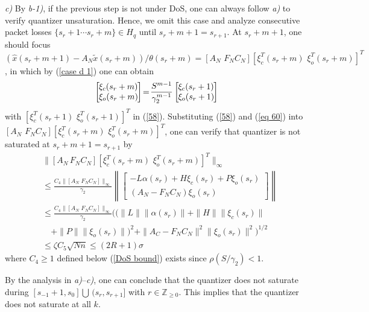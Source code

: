 \documentclass[letterpaper,journal,final,twocolumn]{IEEEtran}
\begin{document}
\emph{c)} By \emph{b-1)}, if the previous step is not under DoS, one can always follow \emph{a)} to verify quantizer unsaturation. Hence, we omit this case and analyze consecutive packet losses $\{s_r + 1 \cdots s_r+m\}\in H_q$ until $s_r+m+1=s_{r+1}$. At $s_r+m+1$, one should focus $ (\hat x(s_r+m+1) - A_N \tilde x(s_r+m))/\theta (s_r+m)= [A_N \,\, F_N C_N] [\xi_c ^T(s_r+m) \,\,
\xi_ o ^T (s_r+m )]^T$, in which by (\ref{case d 1}) one can obtain 
\begin{eqnarray}\setlength{\arraycolsep}{1pt} \label{eq 60}
	\left[\!
	\begin{array}{ll}
		\xi_c (s_r+m) \\
		\xi_ o  (s_r+m )
	\end{array}
	\!\right] 
	\!= \!
	\frac{S^{m-1} }{\gamma_2 ^{m-1}}
	\left[\!
	\begin{array}{ll}
		\xi_c (s_r+1) \\
		\xi_ o  (s_r+1 )
	\end{array}
	\!\right]
\end{eqnarray}
with $[	\xi_c ^T (s_r+1) \,\, \xi_ o ^T (s_r+1 )]^T$ in (\ref{58}). 
Substituting (\ref{58}) and (\ref{eq 60}) into $[A_N \,\, F_N C_N] [\xi_c ^T(s_r+m) \,\,
\xi_ o ^T (s_r+m )]^T$, one can verify that quantizer is not saturated at $s_r+m+1=s_{r+1}$ by 
\begin{align}\label{61}
& \|[A_N \, F_NC_N ] 
[
\xi_c ^T(s_r+m)\,\,
\xi_ o ^T (s_r+m )
]^T \| _\infty   \nonumber\\
& \le \frac{C_4 \|[A_N \,\, F_N C_N ]\| _\infty }{\gamma_2} 
\left\| 
\left[\!\!\!\!
\begin{array}{c}
-L \alpha(s_r) + H \xi_c(s_r) + P \xi_o(s_r) \\
(A_N -F_N C_N)\xi_o(s_r )
\end{array}\!\!\!\!
\right]
 \right\| \nonumber\\
& \le   \frac{C_4 \|[A_N \,\, F_N C_N ]\| _\infty }{\gamma_2} ((\|L\| \|\alpha(s_r)\| + \|H\| \|\xi_c(s_r)\| \nonumber\\
&  \quad  + \|P\| \|\xi_o(s_r)\|    )^2 + \|A_C-F_NC_N\|^2 \|\xi_o(s_r)\|^2 )^{1/2} \nonumber\\
&  \le \zeta C_5 \sqrt{Nn} \le (2R +1) \sigma
\end{align}
where $C_4\ge 1$ defined below (\ref{DoS bound}) exists since $\rho(S/\gamma_2)<1 $.







By the analysis in \emph{a)}--\emph{c)}, one can conclude that the quantizer does not saturate during $ [s_{-1}+1, s_0]\bigcup\, (s_{r}, s_{r+1}]$ with $r \in \mathbb Z _{\ge0}$. This implies that the quantizer does not saturate at all $k$.
\end{document}
